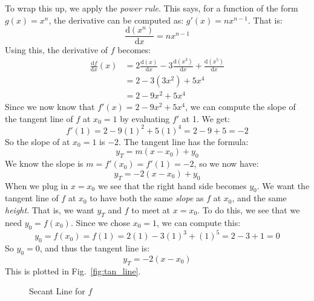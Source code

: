 \documentclass{article}
\theoremstyle{normal}
\begin{document}
    To wrap this up, we apply the \textit{power rule}. This says, for a
    function of the form $g(x)=x^{n}$, the derivative can be computed as:
    $g'(x)=nx^{n-1}$. That is:
    \begin{equation}
        \frac{\textrm{d}(x^{n})}{\textrm{d}x}
        =nx^{n-1}
    \end{equation}
    Using this, the derivative of $f$ becomes:
    \begin{align}
        \frac{\textrm{d}f}{\textrm{d}x}(x)
        &=2\frac{\textrm{d}(x)}{\textrm{d}x}-
            3\frac{\textrm{d}(x^{3})}{\textrm{d}x}+
            \frac{\textrm{d}(x^{5})}{\textrm{d}x}\\
        &=2-3(3x^{2})+5x^{4}\\
        &=2-9x^{2}+5x^{4}
    \end{align}
    Since we now know that $f'(x)=2-9x^{2}+5x^{4}$, we can compute the slope of
    the tangent line of $f$ at $x_{0}=1$ by evaluating $f'$ at 1. We get:
    \begin{equation}
        f'(1)=2-9(1)^{2}+5(1)^{4}=2-9+5=-2
    \end{equation}
    So the slope of at $x_{0}=1$ is $-2$. The tangent line has the formula:
    \begin{equation}
        y_{T}=m(x-x_{0})+y_{0}
    \end{equation}
    We know the slope is $m=f'(x_{0})=f'(1)=-2$, so we now have:
    \begin{equation}
        y_{T}=-2(x-x_{0})+y_{0}
    \end{equation}
    When we plug in $x=x_{0}$ we see that the right hand side becomes $y_{0}$.
    We want the tangent line of $f$ at $x_{0}$ to have both the same
    \textit{slope} as $f$ at $x_{0}$, and the same \textit{height}. That is,
    we want $y_{T}$ and $f$ to meet at $x=x_{0}$. To do this, we see that we
    need $y_{0}=f(x_{0})$. Since we chose $x_{0}=1$, we can compute this:
    \begin{equation}
        y_{0}=f(x_{0})=f(1)=2(1)-3(1)^{3}+(1)^{5}=2-3+1=0
    \end{equation}
    So $y_{0}=0$, and thus the tangent line is:
    \begin{equation}
        y_{T}=-2(x-x_{0})
    \end{equation}
    This is plotted in Fig.~\ref{fig:tan_line}.
    \begin{figure}
        \centering
        \caption{Secant Line for $f$}
        \label{fig:sec_line}
    \end{figure}
\end{document}
